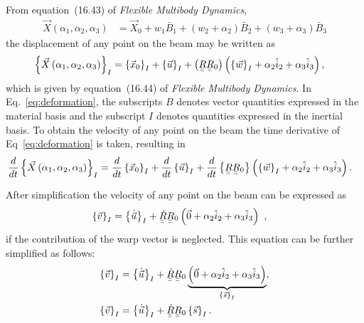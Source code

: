 \documentclass[a4paper]{article}
\newcommand{\ubar}[1]{\underaccent{\bar}{#1}}
\begin{document}
From equation~(16.43) of \textit{Flexible Multibody Dynamics}, \begin{align}
  \vec{X}\left( \alpha_{1}, \alpha_{2}, \alpha_{3} \right)  
  &= \vec{X}_{0} + w_{1}\bar{B}_{1} + \left( w_{2} + \alpha_{2} \right)\bar{B}_{2}
  + \left( w_{3} + \alpha_{3} \right)\bar{B}_{3}
  \label{eq:1643}
\end{align}
the displacement of any point on the beam may be written as 
\begin{align}
  \left\{ \vec{X}\left( \alpha_{1}, \alpha_{2}, \alpha_{3} \right) \right\}_{I}  
  &= \left\{ \vec{x}_{0} \right\}_{I} 
  + \left\{ \vec{u} \right\}_{I} 
  + \left( \ubar{\ubar{R}} \ubar{\ubar{R}}_{0} \right) 
  \left( \left\{ \vec{w} \right\}_{I} + \alpha_{2} \hat{i}_{2} + \alpha_{3} \hat{i}_{3} \right),
  \label{eq:deformation}
\end{align}
which is given by equation~(16.44) of \textit{Flexible Multibody Dynamics}.  In Eq.~\eqref{eq:deformation}, the subscripts $B$ denotes vector quantities expressed in the material basis and the subscript $I$ denotes quantities expressed in the inertial basis.  To obtain the velocity of any point on the beam the time derivative of Eq~\eqref{eq:deformation} is taken, resulting in
\begin{align}
  \frac{d}{dt}\left\{ \vec{X}\left( \alpha_{1}, \alpha_{2}, \alpha_{3} \right) \right\}_{I}  
  &= \frac{d}{dt} \left\{ \vec{x}_{0} \right\}_{I} 
  + \frac{d}{dt} \left\{ \vec{u} \right\}_{I} 
  + \frac{d}{dt} \left\{ \ubar{\ubar{R}} \ubar{\ubar{R}}_{0} \right\}
  \left( \left\{ \vec{w} \right\}_{I} + \alpha_{2} \hat{i}_{2} + \alpha_{3} \hat{i}_{3} \right).
  \label{eq:DdefDt}
\end{align}

After simplification the velocity of any point on the beam can be expressed as  
\begin{align}
  \left\{ \vec{v} \right\}_{I} 
  &= \left\{ \dot{ \vec{u}}\right\}_{I} 
  + \ubar{\ubar{\dot{R}}}\ubar{\ubar{R}}_{0} 
  \left( \vec{0} + \alpha_{2} \hat{i}_{2} + \alpha_{3} \hat{i}_{3} \right) \ ,
\end{align}
if the contribution of the warp vector is neglected.  This equation can be further simplified as follows: 
\begin{align}
  \left\{ \vec{v} \right\}_{I}  
  &= \left\{ \dot{ \vec{u}}\right\}_{I} 
  +  \ubar{\ubar{\dot{R}}} \ubar{\ubar{R}}_{0} 
  \underbrace{\left( \vec{0} + \alpha_{2} \hat{i}_{2} 
  + \alpha_{3} \hat{i}_{3} \right)}_{\left\{ \vec{s} \right\}_{I}}, \\
  \left\{ \vec{v} \right\}_{I} 
  &=  \left\{ \dot{ \vec{u}}\right\}_{I} 
  +  \ubar{\ubar{\dot{R}}} \ubar{\ubar{R}}_{0} \left\{ \vec{s} \right\}_{I}.
  \label{eq:velocity1}
\end{align}
\end{document}
